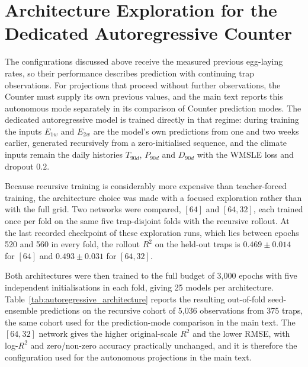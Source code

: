 \documentclass[11pt,a4paper]{article}
\begin{document}
\section{Architecture Exploration for the Dedicated Autoregressive Counter}

The configurations discussed above receive the measured previous egg-laying rates, so their performance describes prediction with continuing trap observations. For projections that proceed without further observations, the Counter must supply its own previous values, and the main text reports this autonomous mode separately in its comparison of Counter prediction modes. The dedicated autoregressive model is trained directly in that regime: during training the inputs $E_{1w}$ and $E_{2w}$ are the model's own predictions from one and two weeks earlier, generated recursively from a zero-initialised sequence, and the climate inputs remain the daily histories $T_{90d}$, $P_{90d}$ and $D_{90d}$ with the WMSLE loss and dropout $0.2$.

Because recursive training is considerably more expensive than teacher-forced training, the architecture choice was made with a focused exploration rather than with the full grid. Two networks were compared, $[64]$ and $[64,32]$, each trained once per fold on the same five trap-disjoint folds with the recursive rollout. At the last recorded checkpoint of these exploration runs, which lies between epochs 520 and 560 in every fold, the rollout $R^2$ on the held-out traps is $0.469 \pm 0.014$ for $[64]$ and $0.493 \pm 0.031$ for $[64,32]$.

Both architectures were then trained to the full budget of 3,000 epochs with five independent initialisations in each fold, giving 25 models per architecture. Table~\ref{tab:autoregressive_architecture} reports the resulting out-of-fold seed-ensemble predictions on the recursive cohort of 5,036 observations from 375 traps, the same cohort used for the prediction-mode comparison in the main text. The $[64,32]$ network gives the higher original-scale $R^2$ and the lower RMSE, with log-$R^2$ and zero/non-zero accuracy practically unchanged, and it is therefore the configuration used for the autonomous projections in the main text.
\end{document}
